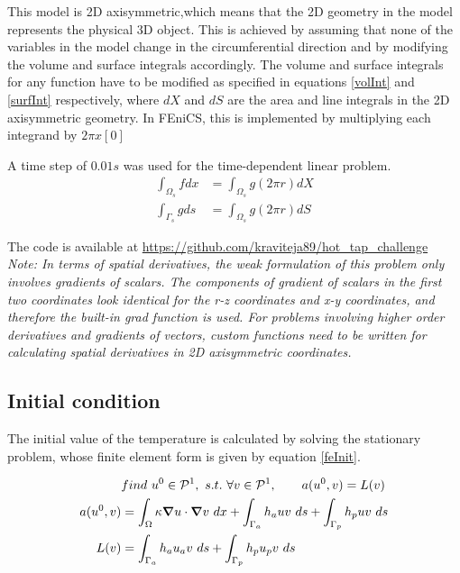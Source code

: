 \documentclass{article}
\begin{document}
This model is 2D axisymmetric,which means that the 2D geometry in the model represents the physical 3D object. This is achieved by assuming that none of the variables in the model change in the circumferential direction and by modifying the volume and surface integrals accordingly. The volume and surface integrals for any function have to be modified as specified in equations \ref{volInt} and \ref{surfInt} respectively, where $dX$ and $dS$ are the area and line integrals in the 2D axisymmetric geometry. In FEniCS, this is implemented by multiplying each integrand by $2 \pi x[0]$

A time step of $0.01s$ was used for the time-dependent linear problem. 
\begin{align}
\int_{\Omega_s} f dx &= \int_{\Omega_s} g (2 \pi r) dX \label{volInt} \\
\int_{\Gamma_s} g ds &= \int_{\Omega_s} g (2 \pi r) dS \label{surfInt}
\end{align}


The code is available at \url{https://github.com/kraviteja89/hot_tap_challenge}\\

\textit{Note: In terms of spatial derivatives, the weak formulation of this problem only involves gradients of scalars. The components of gradient of scalars in the first two coordinates look identical for the r-z coordinates and x-y coordinates, and therefore the built-in grad function is used. For problems involving higher order derivatives and gradients of vectors, custom functions need to be written for calculating spatial derivatives in 2D axisymmetric coordinates.}

\subsection{Initial condition}
The initial value of the temperature is calculated by solving the stationary problem, whose finite element form is given by equation \ref{feInit}.  

\begin{align}
&find ~u^0 \in \mathcal{P}^1,~s.t.~ \forall v \in \mathcal{P}^1, \qquad  a(u^0,v) = L(v) \label{feInit} \\
a(u^0,v) &= \int_\Omega\kappa\grad u \cdot \grad v ~dx  + \int_{\Gamma_a} h_a u v ~ds + \int_{\Gamma_p} h_p u v ~ds \label{initBilinear} \\
L(v) &= \int_{\Gamma_a} h_a u_a v ~ds + \int_{\Gamma_p} h_p u_p v ~ds \label{initLinear}
\end{align}
\end{document}
